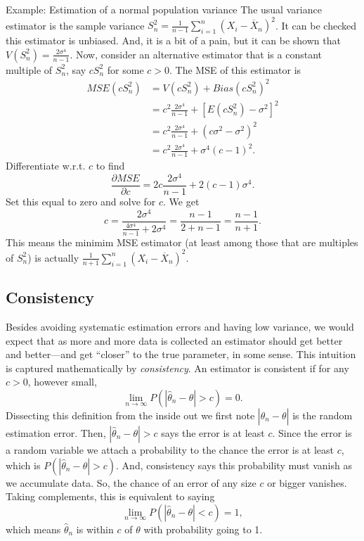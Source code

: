 \documentclass[
]{book}
\begin{document}
Example: Estimation of a normal population variance
The usual variance estimator is the sample variance \(S^2_n = \frac{1}{n-1}\sum_{i=1}^n (X_i - \overline X_n)^2\). It can be checked this estimator is unbiased. And, it is a bit of a pain, but it can be shown that \(V(S_n^2) = \frac{2\sigma^4}{n-1}\). Now, consider an alternative estimator that is a constant multiple of \(S^2_n\), say \(c S_n^2\) for some \(c>0\). The MSE of this estimator is
\begin{align*}
MSE(cS_n^2) &= V(cS_n^2) + Bias(cS_n^2)^2\\
& = c^2\frac{2\sigma^4}{n-1} + [E(cS_n^2) - \sigma^2]^2\\
& = c^2\frac{2\sigma^4}{n-1} + (c\sigma^2 - \sigma^2)^2\\
& = c^2\frac{2\sigma^4}{n-1} + \sigma^4(c-1)^2.
\end{align*}
Differentiate w.r.t. \(c\) to find
\[\frac{\partial MSE}{\partial c} = 2c \frac{2\sigma^4}{n-1} + 2(c-1)\sigma^4.\]
Set this equal to zero and solve for \(c\). We get
\[c = \frac{2\sigma^4}{\frac{4\sigma^4}{n-1} + 2\sigma^4} = \frac{n-1}{2+n-1} = \frac{n-1}{n+1}.\]
This means the minimim MSE estimator (at least among those that are multiples of \(S_n^2\)) is actually \(\frac{1}{n+1}\sum_{i=1}^n (X_i - \overline X_n)^2\).

\hypertarget{consistency}{%
\subsection{Consistency}\label{consistency}}

Besides avoiding systematic estimation errors and having low variance, we would expect that as more and more data is collected an estimator should get better and better---and get ``closer'' to the true parameter, in some sense. This intuition is captured mathematically by \emph{consistency}. An estimator is consistent if for any \(c>0\), however small,
\[\lim_{n\rightarrow \infty} P(|\hat\theta_n-\theta|>c) = 0.\]
Dissecting this definition from the inside out we first note \(|\hat\theta_n - \theta|\) is the random estimation error. Then, \(|\hat\theta_n-\theta|>c\) says the error is at least \(c\). Since the error is a random variable we attach a probability to the chance the error is at least \(c\), which is \(P(|\hat\theta_n-\theta|>c)\). And, consistency says this probability must vanish as we accumulate data. So, the chance of an error of any size \(c\) or bigger vanishes. Taking complements, this is equivalent to saying
\[\lim_{n\rightarrow \infty} P(|\hat\theta_n-\theta|<c) = 1,\]
which means \(\hat\theta_n\) is within \(c\) of \(\theta\) with probability going to 1.
\end{document}
